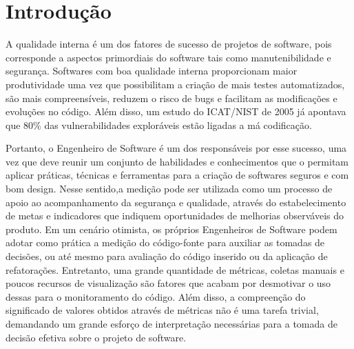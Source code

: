 \section{Introdução}
\label{introduction}

A qualidade interna é um dos fatores de sucesso de projetos de software, pois corresponde a aspectos primordiais do software tais como manutenibilidade e segurança. Softwares com boa qualidade interna proporcionam maior produtividade uma vez que possibilitam a criação de mais testes automatizados, são mais compreensíveis, reduzem o risco de bugs e facilitam as modificações e evoluções no código. Além disso, um estudo do ICAT/NIST de 2005 já apontava que 80\% das vulnerabilidades exploráveis estão ligadas a má codificação.

Portanto, o Engenheiro de Software é um dos responsáveis por esse sucesso, uma vez que deve reunir um conjunto de habilidades e conhecimentos que o permitam aplicar práticas, técnicas e ferramentas para a criação de softwares seguros e com bom design. Nesse sentido,a medição pode ser utilizada como um processo de apoio ao acompanhamento da segurança e qualidade, através do estabelecimento de metas e indicadores que indiquem oportunidades de melhorias observáveis do produto. Em um cenário otimista,
os próprios Engenheiros de Software podem adotar como prática a medição do código-fonte para auxiliar as tomadas de decisões, ou até mesmo para avaliação do código inserido ou da aplicação de refatorações. Entretanto, uma grande quantidade de métricas, coletas manuais e poucos recursos de visualização são fatores que acabam por desmotivar o uso dessas para o monitoramento do código. Além disso, a compreenção do significado de valores obtidos através de métricas não é uma tarefa trivial, demandando um grande esforço de interpretação necessárias para a tomada de decisão efetiva sobre o projeto de software.

